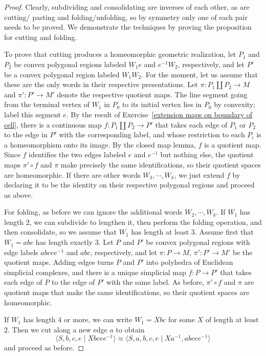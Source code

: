 \begin{proof}
Clearly, subdividing and consolidating are inverses of each other, as are cutting/
pasting and folding/unfolding, so by symmetry only one of each pair needs to be proved. We demonstrate the techniques by proving the proposition for cutting
and folding.\par
To prove that cutting produces a homeomorphic geometric realization, let $P_1$ and
$P_2$ be convex polygonal regions labeled $W_1e$ and $e^{-1}W_2$, respectively, and let $P'$ be a convex polygonal region labeled $W_1W_2$. For the moment, let us 
assume that these are the only words in their respective presentations. Let $\pi:P_1\amalg P_2\to M$ and $\pi':P'\to M'$ denote the respective quotient maps. The 
line segment going from the terminal vertex of $W_1$ in $P_0$ to its initial vertex lies in $P_0$ by convexity; label this segment $e$. By the result of 
Exercise~\ref{extension maps on boundary of cell}, there is a continuous map $f:P_1\amalg P_2\to P'$ that takes each edge of $P_1$ or $P_2$ to the edge in $P'$ with the 
corresponding label, and whose restriction to each $P_i$ is a homeomorphism onto its image. By the closed map lemma, $f$ is a quotient map. Since $f$ identifies the two 
edges labeled $e$ and $e^{-1}$ but nothing else, the quotient maps $\pi'\circ f$ and $\pi$ make precisely the same identifications, so their quotient spaces are 
homeomorphic. If there are other words $W_3,\cdots,W_k$, we just extend $f$ by declaring it to be the identity on their respective polygonal regions and proceed as 
above.\par
For folding, as before we can ignore the additional words $W_2,\cdots,W_k$. If $W_1$ has length $2$, we can subdivide to lengthen it, then perform the folding 
operation, and then consolidate, so we assume that $W_1$ has length at least $3$. Assume first that $W_1=abc$ has length exactly $3$. Let $P$ and $P'$ be convex 
polygonal regions with edge labels $abcee^{-1}$ and $abc$, respectively, and let $\pi:P\to M$, $\pi':P'\to M'$ be the quotient maps. Adding edges turns $P$ and $P'$ 
into polyhedra of Euclidean simplicial complexes, and there is a unique simplicial map $f:P\to P'$ that takes each edge of $P$ to the edge of $P'$ with the same label. 
As before, $\pi'\circ f$ and $\pi$ are quotient maps that make the same identifications, so their quotient spaces are homeomorphic.\par
If $W_1$ has length $4$ or more, we can write $W_1=Xbc$ for some $X$ of length at
least $2$. Then we cut along a new edge $a$ to obtain
\[\langle S,b,c,e\mid Xbcee^{-1}\rangle\approx\langle S,a,b,c,e\mid Xa^{-1}, abcee^{-1}\rangle\]
and proceed as before.
\end{proof}
